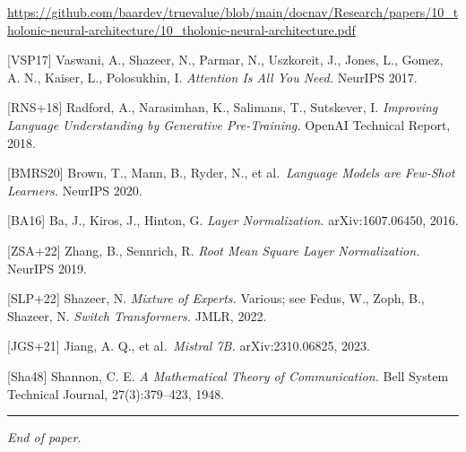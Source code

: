 \documentclass[12pt]{article}
\begin{document}
\url{https://github.com/baardev/truevalue/blob/main/docnav/Research/papers/10_tholonic-neural-architecture/10_tholonic-neural-architecture.pdf}

{[}VSP17{]} Vaswani, A., Shazeer, N., Parmar, N., Uszkoreit, J., Jones,
L., Gomez, A. N., Kaiser, L., Polosukhin, I. \emph{Attention Is All You
Need.} NeurIPS 2017.

{[}RNS+18{]} Radford, A., Narasimhan, K., Salimans, T., Sutskever, I.
\emph{Improving Language Understanding by Generative Pre-Training.}
OpenAI Technical Report, 2018.

{[}BMRS20{]} Brown, T., Mann, B., Ryder, N., et al.~\emph{Language
Models are Few-Shot Learners.} NeurIPS 2020.

{[}BA16{]} Ba, J., Kiros, J., Hinton, G. \emph{Layer Normalization.}
arXiv:1607.06450, 2016.

{[}ZSA+22{]} Zhang, B., Sennrich, R. \emph{Root Mean Square Layer
Normalization.} NeurIPS 2019.

{[}SLP+22{]} Shazeer, N. \emph{Mixture of Experts.} Various; see Fedus,
W., Zoph, B., Shazeer, N. \emph{Switch Transformers.} JMLR, 2022.

{[}JGS+21{]} Jiang, A. Q., et al.~\emph{Mistral 7B.} arXiv:2310.06825,
2023.

{[}Sha48{]} Shannon, C. E. \emph{A Mathematical Theory of
Communication.} Bell System Technical Journal, 27(3):379--423, 1948.

\begin{center}\rule{0.5\linewidth}{0.5pt}\end{center}

\emph{End of paper.}
\end{document}
